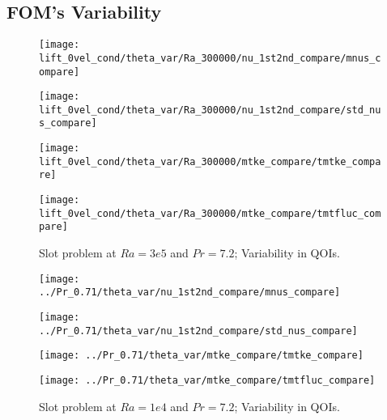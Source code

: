 \subsection{FOM's Variability}
\begin{figure}[h!]
    \begin{minipage}[b]{.25\linewidth}
   \centering 
   \texttt{[image: lift\_0vel\_cond/theta\_var/Ra\_300000/nu\_1st2nd\_compare/mnus\_compare]}
    \end{minipage}%
    \begin{minipage}[b]{.25\linewidth}
   \centering 
   \texttt{[image: lift\_0vel\_cond/theta\_var/Ra\_300000/nu\_1st2nd\_compare/std\_nus\_compare]}
    \end{minipage}%
    \begin{minipage}[b]{.25\linewidth}
   \centering 
   \texttt{[image: lift\_0vel\_cond/theta\_var/Ra\_300000/mtke\_compare/tmtke\_compare]}
    \end{minipage}%
    \begin{minipage}[b]{.25\linewidth}
   \centering 
   \texttt{[image: lift\_0vel\_cond/theta\_var/Ra\_300000/mtke\_compare/tmtfluc\_compare]}
    \end{minipage}%
   \caption{Slot problem at $Ra=3e5$ and $Pr=7.2$; Variability in QOIs.}
\label{fig:slot_pr_7.2_fom_mean} \end{figure}
\begin{figure}[h!]
    \begin{minipage}[b]{.25\linewidth}
   \centering 
   \texttt{[image: ../Pr\_0.71/theta\_var/nu\_1st2nd\_compare/mnus\_compare]}
    \end{minipage}%
    \begin{minipage}[b]{.25\linewidth}
   \centering 
   \texttt{[image: ../Pr\_0.71/theta\_var/nu\_1st2nd\_compare/std\_nus\_compare]}
    \end{minipage}%
    \begin{minipage}[b]{.25\linewidth}
   \centering 
   \texttt{[image: ../Pr\_0.71/theta\_var/mtke\_compare/tmtke\_compare]}
    \end{minipage}%
    \begin{minipage}[b]{.25\linewidth}
   \centering 
   \texttt{[image: ../Pr\_0.71/theta\_var/mtke\_compare/tmtfluc\_compare]}
    \end{minipage}%
   \caption{Slot problem at $Ra=1e4$ and $Pr=7.2$; Variability in QOIs.}
\label{fig:slot_pr_7.2_fom_mean} \end{figure}
